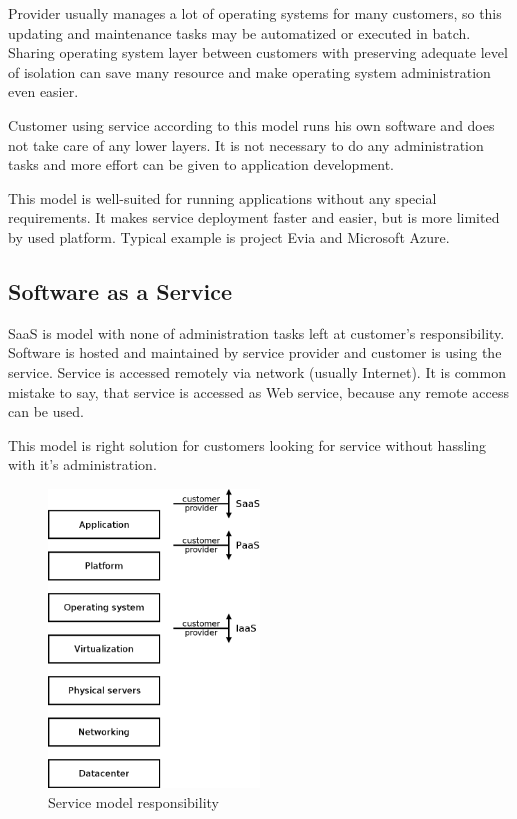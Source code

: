 Provider usually manages a lot of operating systems for many customers, so  this updating and maintenance tasks may be automatized or executed in batch. Sharing operating system layer between customers with preserving adequate level of isolation can save many resource and make operating system administration even easier.

Customer using service according to this model runs his own software and does not take care of any lower layers. It is not necessary to do any administration tasks and more effort can be given to application development. 

This model is well-suited for running applications without any special requirements. It makes service deployment faster and easier, but is more limited by used platform. 
Typical example is project Evia and Microsoft Azure.

\subsection{Software as a Service}
\Ac{SaaS} is model with none of administration tasks left at customer's responsibility. Software is hosted and maintained by service provider and customer is using the service. Service is accessed remotely via network (usually Internet). It is common mistake to say, that service is accessed as Web service, because any remote access can be used. 

This model is right solution for customers looking for service without hassling with it's administration.

\begin{figure}[htb]
	\begin{center}
	\includegraphics[width=0.5\textwidth]{service-models.png}
	\end{center}
	\caption{Service model responsibility}
	\label{img:service-models}
\end{figure}

